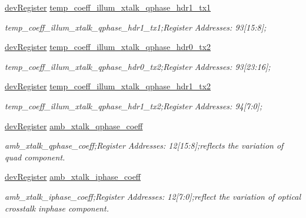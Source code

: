 \begin{DoxyCompactItemize}
\mbox{\hyperlink{classdev_register}{dev\+Register}} \mbox{\hyperlink{class_o_p_t3101_registers_a55499838122169c5f486b25abdeaf5a3}{temp\+\_\+coeff\+\_\+illum\+\_\+xtalk\+\_\+qphase\+\_\+hdr1\+\_\+tx1}}
\begin{DoxyCompactList}\small\item\em temp\+\_\+coeff\+\_\+illum\+\_\+xtalk\+\_\+qphase\+\_\+hdr1\+\_\+tx1;Register Addresses\+: 93\mbox{[}15\+:8\mbox{]}; \end{DoxyCompactList}\item 
\mbox{\hyperlink{classdev_register}{dev\+Register}} \mbox{\hyperlink{class_o_p_t3101_registers_a54a08700e3fbf113ce373076807a5a33}{temp\+\_\+coeff\+\_\+illum\+\_\+xtalk\+\_\+qphase\+\_\+hdr0\+\_\+tx2}}
\begin{DoxyCompactList}\small\item\em temp\+\_\+coeff\+\_\+illum\+\_\+xtalk\+\_\+qphase\+\_\+hdr0\+\_\+tx2;Register Addresses\+: 93\mbox{[}23\+:16\mbox{]}; \end{DoxyCompactList}\item 
\mbox{\hyperlink{classdev_register}{dev\+Register}} \mbox{\hyperlink{class_o_p_t3101_registers_ae7c5e400d7284d0e7bf61342fbc67584}{temp\+\_\+coeff\+\_\+illum\+\_\+xtalk\+\_\+qphase\+\_\+hdr1\+\_\+tx2}}
\begin{DoxyCompactList}\small\item\em temp\+\_\+coeff\+\_\+illum\+\_\+xtalk\+\_\+qphase\+\_\+hdr1\+\_\+tx2;Register Addresses\+: 94\mbox{[}7\+:0\mbox{]}; \end{DoxyCompactList}\item 
\mbox{\hyperlink{classdev_register}{dev\+Register}} \mbox{\hyperlink{class_o_p_t3101_registers_afc46bb579b68a9502857fc4befe600db}{amb\+\_\+xtalk\+\_\+qphase\+\_\+coeff}}
\begin{DoxyCompactList}\small\item\em amb\+\_\+xtalk\+\_\+qphase\+\_\+coeff;Register Addresses\+: 12\mbox{[}15\+:8\mbox{]};reflects the variation of quad component. \end{DoxyCompactList}\item 
\mbox{\hyperlink{classdev_register}{dev\+Register}} \mbox{\hyperlink{class_o_p_t3101_registers_a662ff3f116c2aa3dde421a44c09b18a5}{amb\+\_\+xtalk\+\_\+iphase\+\_\+coeff}}
\begin{DoxyCompactList}\small\item\em amb\+\_\+xtalk\+\_\+iphase\+\_\+coeff;Register Addresses\+: 12\mbox{[}7\+:0\mbox{]};reflect the variation of optical crosstalk inphase component. \end{DoxyCompactList}\item 

\end{DoxyCompactItemize}

